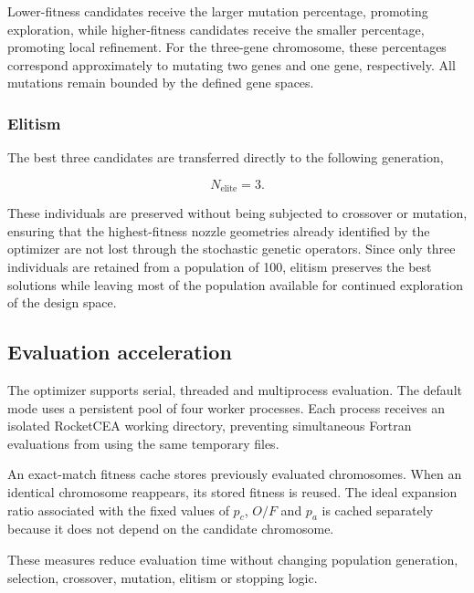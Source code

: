 Lower-fitness candidates receive the larger mutation percentage, promoting
exploration, while higher-fitness candidates receive the smaller percentage,
promoting local refinement. For the three-gene chromosome, these percentages
correspond approximately to mutating two genes and one gene, respectively. All
mutations remain bounded by the defined gene spaces.

\subsubsection{Elitism}

The best three candidates are transferred directly to the following generation,

\begin{equation}
N_{\mathrm{elite}}=3.
\label{eq:ga_elitism}
\end{equation}

These individuals are preserved without being subjected to crossover or mutation, ensuring that the highest-fitness nozzle geometries already identified by the optimizer are not lost through the stochastic genetic operators. Since only three individuals are retained from a population of 100, elitism preserves the best solutions while leaving most of the population available for continued exploration of the design space. 

\subsection{Evaluation acceleration}

The optimizer supports serial, threaded and multiprocess evaluation. The default mode
uses a persistent pool of four worker processes. Each process receives an isolated
RocketCEA working directory, preventing simultaneous Fortran evaluations from using
the same temporary files.

An exact-match fitness cache stores previously evaluated chromosomes. When an
identical chromosome reappears, its stored fitness is reused. The ideal expansion
ratio associated with the fixed values of \(p_c\), \(O/F\) and \(p_a\) is cached
separately because it does not depend on the candidate chromosome.

These measures reduce evaluation time without changing population generation,
selection, crossover, mutation, elitism or stopping logic.

